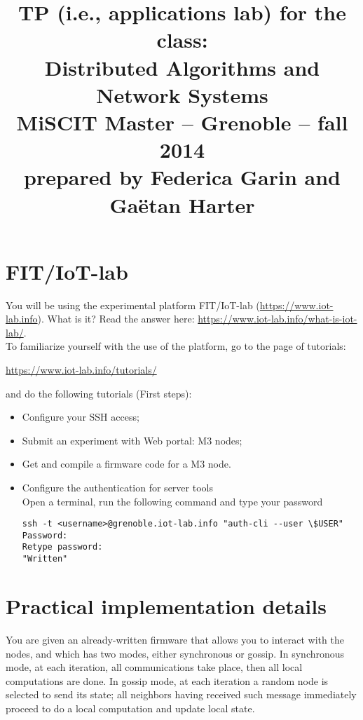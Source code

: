 \documentclass{article}
\begin{document}
\title{
{\normalsize TP (i.e., applications lab) for the class:}\\[-1mm]
Distributed Algorithms and Network Systems\\[-2mm]
{\normalsize MiSCIT Master -- Grenoble -- fall 2014}\\[-1mm]
{\normalsize prepared by Federica Garin and Ga\"{e}tan Harter}}
\date{}
\maketitle

\vspace{-2cm}
\section{FIT/IoT-lab}
You will be using the experimental platform FIT/IoT-lab (\url{https://www.iot-lab.info}).
What is it? Read the answer here: \url{https://www.iot-lab.info/what-is-iot-lab/}.\\

To familiarize yourself with the use of the platform, go to the page of tutorials:
\begin{center} \url{https://www.iot-lab.info/tutorials/} \end{center}
and do the following tutorials (First steps):
\begin{itemize}
\item Configure your SSH access;
\item Submit an experiment with Web portal: M3 nodes;
\item Get and compile a firmware code for a M3 node.

\item Configure the authentication for server tools\\
    Open a terminal, run the following command and type your password
\begin{verbatim}ssh -t <username>@grenoble.iot-lab.info "auth-cli --user \$USER"
Password:
Retype password:
"Written"
\end{verbatim}
\end{itemize}



\section{Practical implementation details}

You are given an already-written firmware that allows you to interact with the nodes, and which has two modes, either synchronous or gossip. In synchronous mode, at each iteration, all communications take place, then all local computations are done. In gossip mode, at each iteration a random node is selected to send its state; all neighbors having received such message immediately proceed to do a local computation and update local state.
\end{document}
